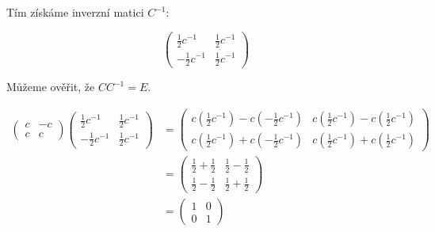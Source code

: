 \documentclass{article}
\begin{document}
Tím získáme inverzní matici $C^{-1}$:

\begin{equation*}
    \begin{pmatrix}
        \tfrac{1}{2} c^{-1}   & \tfrac{1}{2} c^{-1} \\
        - \tfrac{1}{2} c^{-1} & \tfrac{1}{2} c^{-1}
    \end{pmatrix}
\end{equation*}

Můžeme ověřit, že $C C^{-1} = E$.

\begin{align*}
    \begin{pmatrix}
        c & -c \\
        c & c
    \end{pmatrix}
    \begin{pmatrix}
        \tfrac{1}{2} c^{-1}   & \tfrac{1}{2} c^{-1} \\
        - \tfrac{1}{2} c^{-1} & \tfrac{1}{2} c^{-1}
    \end{pmatrix}
     & =
    \begin{pmatrix}
        c \left(\tfrac{1}{2} c^{-1}\right)
        - c \left(- \tfrac{1}{2} c^{-1}\right) &
        c \left(\tfrac{1}{2} c^{-1}\right)
        - c \left(\tfrac{1}{2} c^{-1}\right)
        \\
        c \left(\tfrac{1}{2} c^{-1}\right)
        + c \left(-\tfrac{1}{2} c^{-1}\right)  &
        c \left(\tfrac{1}{2} c^{-1}\right)
        + c \left(\tfrac{1}{2} c^{-1}\right)
    \end{pmatrix} \\
     & =
    \begin{pmatrix}
        \tfrac{1}{2} + \tfrac{1}{2} &
        \tfrac{1}{2} - \tfrac{1}{2}
        \\
        \tfrac{1}{2} - \tfrac{1}{2} &
        \tfrac{1}{2} + \tfrac{1}{2}
    \end{pmatrix}            \\
     & =
    \begin{pmatrix}
        1 & 0 \\
        0 & 1
    \end{pmatrix}
\end{align*}
\end{document}
